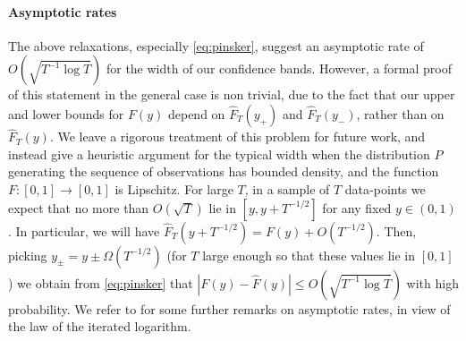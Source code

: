 \documentclass[3p, authoryear, 10pt]{elsarticle}%
\begin{document}
\paragraph{Asymptotic rates} The above relaxations, especially \eqref{eq:pinsker}, suggest an asymptotic rate of $O(\sqrt{T^{-1}\log T})$ for the width of our confidence bands. However, a formal proof of this statement in the general case is non trivial, due to the fact that our upper and lower bounds for $F(y)$ depend on $\hat F_T(y_+)$ and $\hat F_T(y_-)$, rather than on $\hat F_T(y)$. We leave a rigorous treatment of this problem for future work, and instead give a heuristic argument for the typical width when the distribution $P$ generating the sequence of observations has bounded density, and the function $F:[0,1]\to[0,1]$ is Lipschitz. For large $T$, in a sample of $T$ data-points we expect that no more than $O(\sqrt T)$ lie in $[y, y+T^{-1/2}]$ for any fixed $y\in(0,1)$. In particular, we will have $\hat F_T(y+T^{-1/2}) = F(y) + O(T^{-1/2})$. Then, picking $y_\pm = y\pm\Omega(T^{-1/2})$ (for $T$ large enough so that these values lie in $[0,1]$) we obtain from \eqref{eq:pinsker} that $|F(y)-\hat F(y)|\leq O(\sqrt{T^{-1}\log T})$ with high probability. We refer to  for some further remarks on asymptotic rates, in view of the law of the iterated logarithm.
\end{document}

